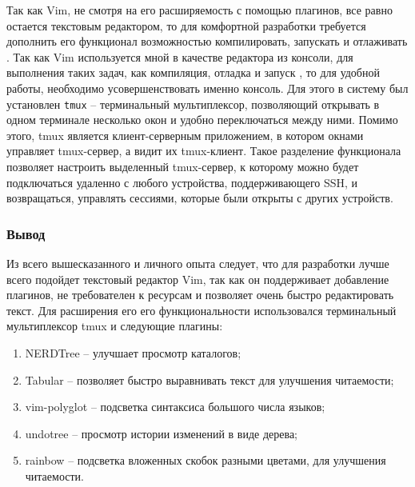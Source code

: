 Так как Vim, не смотря на его расширяемость с помощью плагинов, все равно остается текстовым редактором,
то для комфортной разработки требуется дополнить его функционал возможностью компилировать, 
запускать и отлаживать {\ProgModule}. Так как Vim используется мной в качестве редактора из
консоли, для выполнения таких задач, как компиляция, отладка и запуск {\ProgModule}, то для удобной работы,
необходимо усовершенствовать именно консоль.
Для этого в систему был установлен \verb|tmux| -- терминальный мультиплексор,
позволяющий открывать в одном терминале несколько окон и удобно переключаться
между ними. Помимо этого, tmux является клиент-серверным приложением, в котором
окнами управляет tmux-сервер, а видит их tmux-клиент. Такое разделение
функционала позволяет настроить выделенный tmux-сервер, к которому можно будет
подключаться удаленно с любого устройства, поддерживающего SSH, и возвращаться,
управлять сессиями, которые были открыты с других устройств.

\subsubsection{Вывод}\label{sec:ch2/sec1/sub1/sub4}
Из всего вышесказанного и личного опыта следует, 
что для разработки {\ProgModule} лучше всего подойдет текстовый редактор Vim,
так как он поддерживает добавление плагинов, не требователен к ресурсам и позволяет
очень быстро редактировать текст. Для расширения его его функциональности использовался
терминальный мультиплексор tmux и следующие плагины:
\begin{enumerate}[label={\arabic*)}]
    \item NERDTree \autocite{nerdtree} -- улучшает просмотр каталогов;
    \item Tabular \autocite{tabular} -- позволяет быстро выравнивать текст
        для улучшения читаемости;
    \item vim-polyglot \autocite{vim-polyglot} -- подсветка синтаксиса большого
        числа языков;
    \item undotree \autocite{undotree} -- просмотр истории изменений в виде дерева;
    \item rainbow \autocite{rainbow} -- подсветка вложенных скобок разными цветами,
        для улучшения читаемости.
\end{enumerate}


